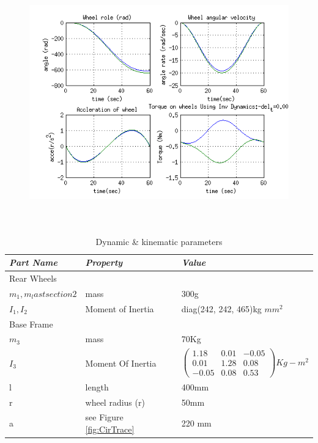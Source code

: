 { \begin{figure}
	\includegraphics[height=300pt,keepaspectratio]{Chapter4/fig/FD}
	\label{fig:spiral} 
\end{figure} 
%
\begin{table}[!htbp]
	\caption{Dynamic \& kinematic parameters }
	\label{tb:massproperty}
	\centering
	\begin{tabular}{l l l}
		\hline
		\emph{Part Name}  & \emph{ Property} & \emph{Value} \\
		\hline
		Rear Wheels & & \\
		 $m_1,m_last section2$	& mass				&300g \\ 
		  $I_1,I_2$	& Moment of Inertia	& diag(242, 242, 465)kg $mm^2$\\
		Base Frame& & \\
		 $m_3$ & mass  & 70Kg \\
		 $ I_3$& Moment Of Inertia & $ \begin{pmatrix}
		 1.18& 0.01&-0.05\\ 0.01 & 1.28 & 0.08\\
		 -0.05 & 0.08 & 0.53
		 \end{pmatrix} Kg-m^2$ \\
		   l & length & 400mm\\
		  r & wheel radius (r) & 50mm\\
		 a & see Figure \ref{fig:CirTrace} & 220 mm \\ 
		\hline
		\end{tabular}
\end{table}



}
